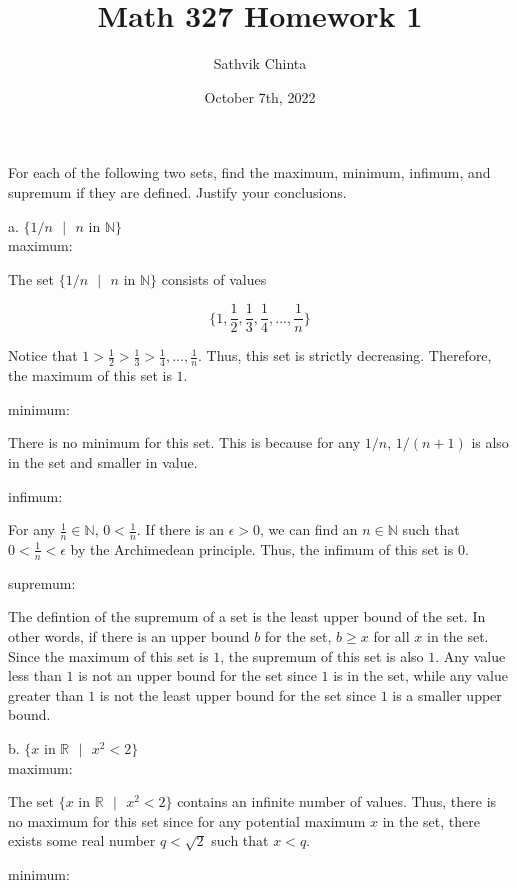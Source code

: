 \documentclass[addpoints]{exam}
\title{Math 327 Homework 1}
\author{Sathvik Chinta}
\date{October 7th, 2022}
\begin{document}
\maketitle

\begin{questions}
\question For each of the following two sets, find the maximum, minimum, infimum, and
supremum if they are defined. Justify your conclusions. 

a. $\{ 1/n \text{ } | \text{ } n \text{ in } \mathbb{N} \}$ \\
maximum:

The set $\{ 1/n \text{ } | \text{ } n \text{ in } \mathbb{N} \}$ consists of values

\[\{1, \frac{1}{2}, \frac{1}{3}, \frac{1}{4}, ..., \frac{1}{n}\}\]

Notice that $1 > \frac{1}{2} > \frac{1}{3} > \frac{1}{4}, ..., \frac{1}{n}$. Thus, 
this set is strictly decreasing. Therefore, the maximum of this set is $1$.

minimum:

There is no minimum for this set. This is because for any $1/n$, 
$1/(n+1)$ is also in the set and smaller in value. 

infimum:

For any $\frac{1}{n} \in \mathbb{N}$, $0 < \frac{1}{n}$. If there is an $\epsilon > 0$,
we can find an $n \in \mathbb{N}$ such that $0 < \frac{1}{n} < \epsilon$ by the 
Archimedean principle. Thus, the infimum of this set is $0$.

supremum:

The defintion of the supremum of a set is the least upper bound of the set. In other words, 
if there is an upper bound $b$ for the set, $b \geq x$ for all $x$ in the set. Since the 
maximum of this set is $1$, the supremum of this set is also $1$. Any value less than 
$1$ is not an upper bound for the set since $1$ is in the set, while any value greater
than $1$ is not the least upper bound for the set since $1$ is a smaller upper bound.

b. $\{ x \text{ in } \mathbb{R} \text{ } | \text{ } x^2 < 2 \}$ \\
maximum:

The set $\{ x \text{ in } \mathbb{R} \text{ } | \text{ } x^2 < 2 \}$ contains
an infinite number of values. Thus, there is no maximum for this set since for any 
potential maximum $x$ in the set, there exists some real number $q < \sqrt{2}$ such that
$x < q$.

minimum:


\end{questions}
\end{document}
